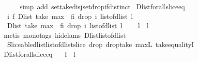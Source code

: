 \begin{isabellebody}
\ \ {\isacharparenright}\ {\isacharequal}\ {\isacharbraceleft}{\isacharbraceright}{\isachardoublequoteclose}\isanewline
%
\isadelimproof
%
\endisadelimproof
%
\isatagproof
{}\isamarkupfalse%
\ {\isacharparenleft}simp\ add{\isacharcolon}\ set{\isacharunderscore}take{\isacharunderscore}disj{\isacharunderscore}set{\isacharunderscore}drop{\isacharunderscore}if{\isacharunderscore}distinct{\isacharparenright}%
\endisatagproof
{\isafoldproof}%
%
\isadelimproof
\isanewline
%
\endisadelimproof
\isanewline
{}\isamarkupfalse%
\ Dlist{\isacharunderscore}forall{\isacharunderscore}slice{\isacharunderscore}eq{}{\isacharcolon}\ \isanewline
\ \ {\isachardoublequoteopen}{\isacharparenleft}{\isasymforall}i\ f{\isachardot}\ {\isacharparenleft}Dlist\ {\isacharparenleft}take\ {\isacharparenleft}max\ {}\ {\isacharparenleft}f{\isacharminus}i{\isacharparenright}{\isacharparenright}\ {\isacharparenleft}drop\ i\ {\isacharparenleft}list{\isacharunderscore}of{\isacharunderscore}dlist\ l{}{\isacharparenright}{\isacharparenright}{\isacharparenright}\ {\isacharequal}\ \isanewline
\ \ Dlist\ {\isacharparenleft}take\ {\isacharparenleft}max\ {}\ {\isacharparenleft}f{\isacharminus}i{\isacharparenright}{\isacharparenright}\ {\isacharparenleft}drop\ i\ {\isacharparenleft}list{\isacharunderscore}of{\isacharunderscore}dlist\ l{}{\isacharparenright}{\isacharparenright}{\isacharparenright}{\isacharparenright}{\isacharparenright}\ {\isasymLongrightarrow}\ \isanewline
\ \ l{}\ {\isacharequal}\ l{}{\isachardoublequoteclose}\isanewline
%
\isadelimproof
%
\endisadelimproof
%
\isatagproof
{}\isamarkupfalse%
\ {\isacharparenleft}metis\ {\isacharparenleft}mono{\isacharunderscore}tags{\isacharcomma}\ hide{\isacharunderscore}lams{\isacharparenright}\ Dlist{\isacharunderscore}list{\isacharunderscore}of{\isacharunderscore}dlist\ \isanewline
\ \ Sliceable{\isacharunderscore}dlist{\isachardot}list{\isacharunderscore}of{\isacharunderscore}dlist{\isacharunderscore}slice\ drop{\isacharunderscore}{}\ drop{\isacharunderscore}take\ max{\isacharunderscore}{}L\ take{\isacharunderscore}equalityI{\isacharparenright}%
\endisatagproof
{\isafoldproof}%
%
\isadelimproof
\isanewline
%
\endisadelimproof
\isanewline
{}\isamarkupfalse%
\ Dlist{\isacharunderscore}forall{\isacharunderscore}slice{\isacharunderscore}eq{\isacharcolon}\ \isanewline
\ \ {\isachardoublequoteopen}l{}\ {\isacharequal}\ l{}\ {\isasymlongleftrightarrow}\ \ \isanewline

\end{isabellebody}
